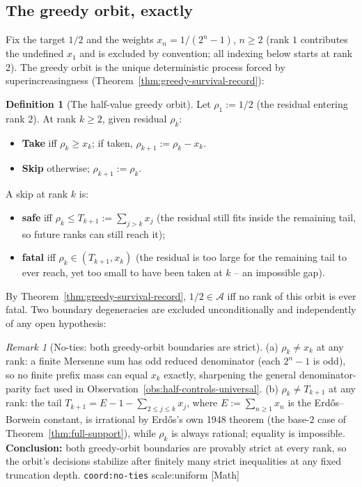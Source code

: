 \documentclass[11pt]{article}
\theoremstyle{plain}
\theoremstyle{definition}
\newtheorem{defn}[thm]{Definition}
\theoremstyle{remark}
\newtheorem{rem}[thm]{Remark}
\newcommand{\ev}[1]{{\small\textsf{[#1]}}\xspace}
\newcommand{\scale}[1]{{\small\textsf{scale:#1}}\xspace}
\newcommand{\coord}[1]{\texorpdfstring{{\small\nolinkurl{coord:#1}}}{coord:#1}\xspace}
\begin{document}
\subsection{The greedy orbit, exactly}
\label{ssec:greedy-orbit}

Fix the target $1/2$ and the weights $x_n = 1/(2^n-1)$, $n \ge 2$ (rank $1$ contributes the
undefined $x_1$ and is excluded by convention; all indexing below starts at rank $2$). The greedy
orbit is the unique deterministic process forced by superincreasingness
(Theorem~\ref{thm:greedy-survival-record}):

\begin{defn}[The half-value greedy orbit]
\label{defn:greedy-orbit}
Let $\rho_1 := 1/2$ (the residual entering rank $2$). At rank $k \ge 2$, given residual $\rho_k$:
\begin{itemize}[nosep]
\item \textbf{Take} iff $\rho_k \ge x_k$; if taken, $\rho_{k+1} := \rho_k - x_k$.
\item \textbf{Skip} otherwise; $\rho_{k+1} := \rho_k$.
\end{itemize}
A skip at rank $k$ is:
\begin{itemize}[nosep]
\item \textbf{safe} iff $\rho_k \le T_{k+1} := \sum_{j>k} x_j$ (the residual still fits inside the
remaining tail, so future ranks can still reach it);
\item \textbf{fatal} iff $\rho_k \in (T_{k+1}, x_k)$ (the residual is too large for the remaining
tail to ever reach, yet too small to have been taken at $k$ -- an impossible gap).
\end{itemize}
\end{defn}

By Theorem~\ref{thm:greedy-survival-record}, $1/2 \in \mathcal{A}$ iff no rank of this orbit is ever fatal.
Two boundary degeneracies are excluded unconditionally and independently of any open hypothesis:

\begin{rem}[No-ties: both greedy-orbit boundaries are strict]
\label{rem:no-ties}
(a) $\rho_k \ne x_k$ at any rank: a finite Mersenne sum has odd reduced denominator (each $2^n-1$ is
odd), so no finite prefix mass can equal $x_k$ exactly, sharpening the general
denominator-parity fact used in Observation~\ref{obs:half-controls-universal}.
(b) $\rho_k \ne T_{k+1}$ at any rank: the tail $T_{k+1} = E - 1 - \sum_{2 \le j \le k} x_j$, where
$E := \sum_{n\ge1} x_n$ is the Erd\H{o}s--Borwein constant, is irrational by Erd\H{o}s's own 1948
theorem (the base-$2$ case of Theorem~\ref{thm:full-support}), while $\rho_k$ is always rational;
equality is impossible. \textbf{Conclusion:} both greedy-orbit boundaries are provably strict at
every rank, so the orbit's decisions stabilize after finitely many strict inequalities at any fixed
truncation depth. \coord{no-ties} \scale{uniform} \ev{Math}
\end{rem}
\end{document}
